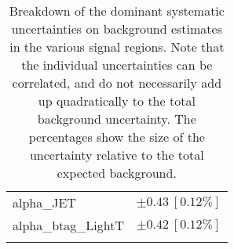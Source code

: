 \begin{table}
\begin{center}
\begin{tabular*}{\textwidth}{@{\extracolsep{\fill}}lc}
alpha\_JET         & $\pm 0.43\ [0.12\%] $       \\
alpha\_btag\_LightT         & $\pm 0.42\ [0.12\%] $       \\
\noalign{\smallskip}\hline\noalign{\smallskip}
\end{tabular*}
\end{center}
\caption[Breakdown of uncertainty on background estimates]{
Breakdown of the dominant systematic uncertainties on background estimates in the various signal regions.
Note that the individual uncertainties can be correlated, and do not necessarily add up quadratically to 
the total background uncertainty. The percentages show the size of the uncertainty relative to the total expected background.
\label{table.results.bkgestimate.uncertainties.TRMMEM_cuts}}
\end{table}
%